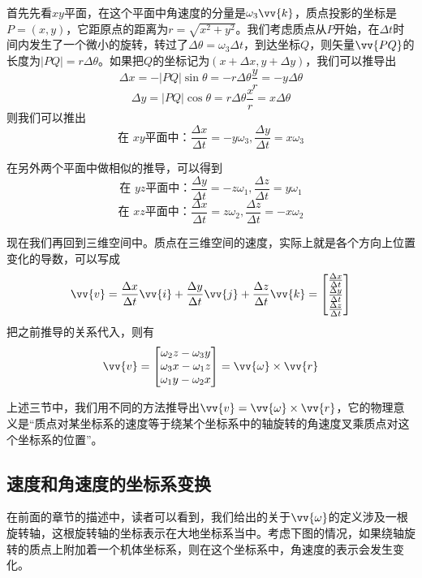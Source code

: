 \documentclass[11pt]{article}
\begin{document}
首先先看$xy$平面，在这个平面中角速度的分量是$\omega_3\vv{k}$，质点投影的坐标是$P=(x,y)$，它距原点的距离为$r = \sqrt{x^2+y^2}$。我们考虑质点从$P$开始，在$\Delta t$时间内发生了一个微小的旋转，转过了$\Delta\theta = \omega_3\Delta t$，到达坐标$Q$，则矢量$\vv{PQ}$的长度为$|PQ| = r\Delta\theta$。如果把$Q$的坐标记为$(x+\Delta x, y + \Delta y)$，我们可以推导出
$$
\Delta x = - |PQ|\sin\theta = - r\Delta\theta \frac{y}{r} = -y \Delta\theta
$$
$$
\Delta y =  |PQ|\cos\theta =  r\Delta\theta \frac{x}{r} = x \Delta\theta
$$
则我们可以推出
$$
\text{在 $xy$平面中：} \frac{\Delta x}{\Delta t} = -y \omega_3 ,  \frac{\Delta y}{\Delta t} = x \omega_3
$$

在另外两个平面中做相似的推导，可以得到
$$
\text{在 $yz$平面中：} \frac{\Delta y}{\Delta t} = -z \omega_1 ,  \frac{\Delta z}{\Delta t} = y \omega_1
$$
$$
\text{在 $xz$平面中：} \frac{\Delta x}{\Delta t} = z \omega_2 ,  \frac{\Delta z}{\Delta t} = -x \omega_2
$$

现在我们再回到三维空间中。质点在三维空间的速度，实际上就是各个方向上位置变化的导数，可以写成
$$
\vv{v} = \frac{\Delta x}{\Delta t} \vv{i} + \frac{\Delta y}{\Delta t} \vv{j} + \frac{\Delta z}{\Delta t} \vv{k} =
\begin{bmatrix}
\frac{\Delta x}{\Delta t} \\
\frac{\Delta y}{\Delta t} \\
\frac{\Delta z}{\Delta t} 
\end{bmatrix}
$$
把之前推导的关系代入，则有
$$
\vv{v} = \begin{bmatrix}
\omega_2z - \omega_3y \\
\omega_3x - \omega_1z \\
\omega_1y - \omega_2x 
\end{bmatrix}
= \vv{\omega} \times \vv{r}
$$

上述三节中，我们用不同的方法推导出$\vv{v} = \vv{\omega} \times \vv{r}$，它的物理意义是“质点对某坐标系的速度等于绕某个坐标系中的轴旋转的角速度叉乘质点对这个坐标系的位置”。


\subsection{速度和角速度的坐标系变换}
在前面的章节的描述中，读者可以看到，我们给出的关于$\vv{\omega}$的定义涉及一根旋转轴，这根旋转轴的坐标表示在大地坐标系当中。考虑下图的情况，如果绕轴旋转的质点上附加着一个机体坐标系，则在这个坐标系中，角速度的表示会发生变化。
\end{document}
